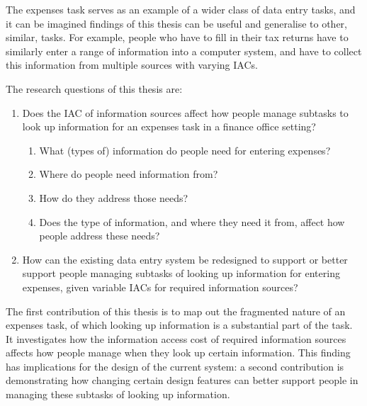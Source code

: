 The expenses task serves as an example of a wider class of data entry tasks, and it can be imagined findings of this thesis can be useful and generalise to other, similar, tasks. For example, people who have to fill in their tax returns have to similarly enter a range of information into a computer system, and have to collect this information from multiple sources with varying IACs.

The research questions of this thesis are:

\begin{enumerate}
\item Does the IAC of information sources affect how people manage subtasks to look up information for an expenses task in a finance office setting?
\begin{enumerate}
\item	What (types of) information do people need for entering expenses?
\item	Where do people need information from?
\item	How do they address those needs?
\item	Does the type of information, and where they need it from, affect how people address these needs?
\end{enumerate}
\item	How can the existing data entry system be redesigned to support or better support people managing subtasks of looking up information for entering expenses, given variable IACs for required information sources?
\end{enumerate}


The first contribution of this thesis is to map out the fragmented nature of an expenses task, of which looking up information is a substantial part of the task. It investigates how the information access cost of required information sources affects how people manage when they look up certain information. This finding has implications for the design of the current system: a second contribution is demonstrating how changing certain design features can better support people in managing these subtasks of looking up information.

